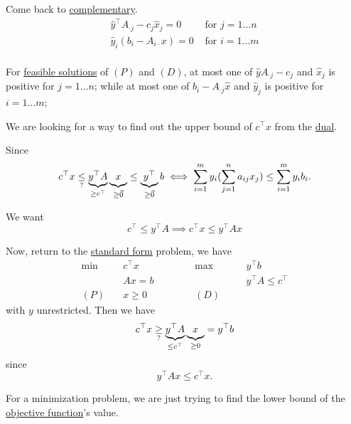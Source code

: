 Come back to \hyperref[def:complementary]{complementary}.
\[
	\begin{split}
		\hat{y}^{\top} A_{\cdot j} - c_{j}\hat{x}_j = 0 &\text{ for }j = 1\ldots n\\
		\hat{y}_i(b_{i} - A_{i\cdot }x) = 0 &\text{ for }i = 1\ldots m\\
	\end{split}
\]

\begin{note}
	For \hyperref[def:feasible-solution]{feasible solutions} of \((P)\) and \((D)\), at most one of \(\hat{y}A_{\cdot j} - c_{j}\) and \(\hat{x}_j\) is positive for \(j = 1\ldots n\);
	while at most one of \(b_{i} - A_{\cdot j}\hat{x}\) and \(\hat{y}_j\) is positive for \(i = 1\ldots m\);
\end{note}

\begin{problem}
We are looking for a way to find out the upper bound of \(c^{\top}x\) from the \hyperref[def:dual]{dual}.
\end{problem}
\begin{answer}
	Since
	\[
		c^{\top}x \underset{?}{\leq} \underbrace{y^{\top} A }_{\geq c^{\top}}\underbrace{\vphantom{y^{\top}A}x}_{\geq \vec{0}} \leq \underbrace{y^{\top}}_{\geq  \vec{0}}b\iff \sum\limits_{i=1}^{m} y_{i}(\sum\limits_{j=1}^{n} a_{ij}x_{j})\leq \sum\limits_{i=1}^{m} y_{i}b_{i}.
	\]

	We want
	\[
		c^{\top}\leq y^{\top}A\implies c^{\top}x\leq y^{\top} Ax
	\]

	Now, return to the \hyperref[def:standard-form]{standard form} problem, we have
	\[
		\begin{alignedat}{5}
			\min~&c^{\top}x\qquad\qquad &&\max ~ &&y^{\top}b\\
			&Ax = b && &&y^{\top}A\leq c^{\top}\\
			(P)\quad&x\geq  0 &&(D)\quad&&
		\end{alignedat}
	\]
	with \(y\) unrestricted. Then we have
	\[
		c^{\top}x\underset{?}{\geq} \underbrace{y^{\top}A}_{\leq c^{\top}}\underbrace{\vphantom{y^{\top}A}x}_{\geq 0} = y^{\top} b
	\]
	since \[
		y^{\top}Ax\leq c^{\top}x.
	\]
\end{answer}

\begin{intuition}
	For a minimization problem, we are just trying to find the lower bound of the \hyperref[def:objective-function]{objective function}'s value.
\end{intuition}

